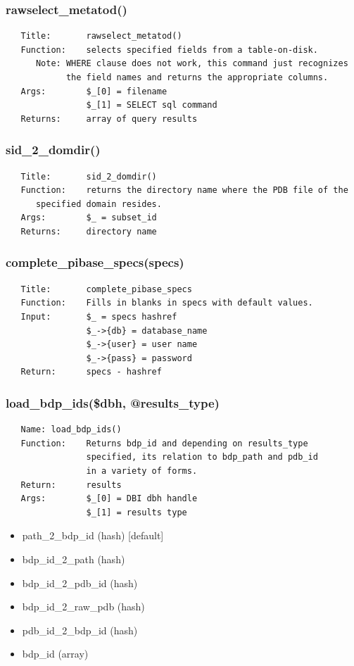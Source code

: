 \documentclass{article}
\begin{document}
\subsubsection*{rawselect\_metatod()\label{pibase_pm_rawselect_metatod_}}
\begin{verbatim}
   Title:       rawselect_metatod()
   Function:    selects specified fields from a table-on-disk.
      Note: WHERE clause does not work, this command just recognizes
            the field names and returns the appropriate columns.
   Args:        $_[0] = filename
                $_[1] = SELECT sql command
   Returns:     array of query results
\end{verbatim}
\subsubsection*{sid\_2\_domdir()\label{pibase_pm_sid_2_domdir_}}
\begin{verbatim}
   Title:       sid_2_domdir()
   Function:    returns the directory name where the PDB file of the
      specified domain resides.
   Args:        $_ = subset_id
   Returns:     directory name
\end{verbatim}
\subsubsection*{complete\_pibase\_specs(specs)\label{pibase_pm_complete_pibase_specs_specs_}}
\begin{verbatim}
   Title:       complete_pibase_specs
   Function:    Fills in blanks in specs with default values.
   Input:       $_ = specs hashref
                $_->{db} = database_name
                $_->{user} = user name
                $_->{pass} = password
   Return:      specs - hashref
\end{verbatim}
\subsubsection*{load\_bdp\_ids(\$dbh, @results\_type)\label{pibase_pm_load_bdp_ids_dbh_results_type_}}
\begin{verbatim}
   Name: load_bdp_ids()
   Function:    Returns bdp_id and depending on results_type
                specified, its relation to bdp_path and pdb_id
                in a variety of forms.
   Return:      results
   Args:        $_[0] = DBI dbh handle
                $_[1] = results type
\end{verbatim}
\begin{itemize}

\item path\_2\_bdp\_id (hash) [default]
\item bdp\_id\_2\_path (hash)
\item bdp\_id\_2\_pdb\_id (hash)
\item bdp\_id\_2\_raw\_pdb (hash)
\item pdb\_id\_2\_bdp\_id (hash)
\item bdp\_id (array)\end{itemize}
\end{document}
